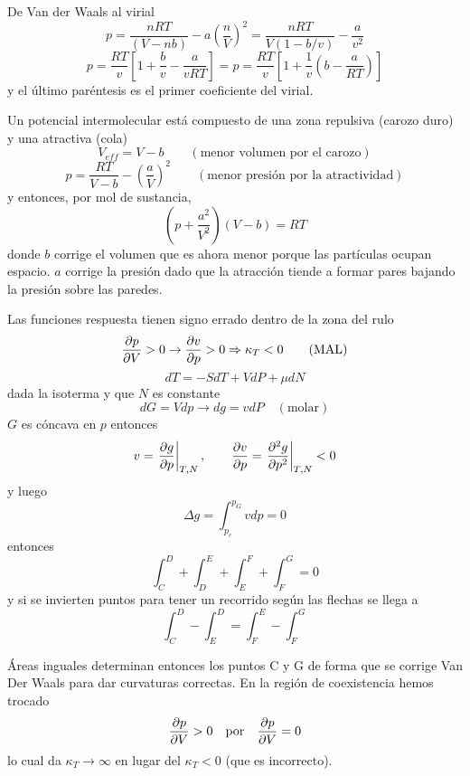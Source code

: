 \documentclass[10pt,oneside]{CBFT_book}
\begin{document}
De Van der Waals al virial
\[
	p = \frac{nRT}{(V-nb)} - a \left(\frac{n}{V} \right)^2 = 
	\frac{nRT}{V(1-b/v)}- \frac{a}{v^2}
\]
\[
	p = \frac{RT}{v}\left[ 1 + \frac{b}{v} - \frac{a}{vRT} \right] =
	p = \frac{RT}{v}\left[ 1 + \frac{1}{v}\left( b - \frac{a}{RT} \right) \right]
\]
y el último paréntesis es el primer coeficiente del virial.

Un potencial intermolecular está compuesto de una zona repulsiva (carozo duro) y una atractiva (cola)
\[
	V_{eff} = V-b \qquad (\text{menor volumen por el carozo})
\]
\[
	p = \frac{RT}{V-b} - \left(\frac{a}{V}\right)^2 \qquad (\text{menor presión por la atractividad})
\]
y entonces, por mol de sustancia,
\[
	\left( p +\frac{a^2}{V^2} \right)(V- b)= RT
\]
donde $b$ corrige el volumen que es ahora menor porque las partículas ocupan espacio. 
$a$ corrige la presión dado que la atracción tiende a formar pares bajando la presión sobre las paredes.

Las funciones respuesta tienen signo errado dentro de la zona del rulo
\[
	\dpar{p}{V}>0 \rightarrow  \dpar{v}{p} >0 \Rightarrow \kappa_T < 0 \qquad (\mathrm{MAL})
\]
\[
	dT = -SdT + VdP + \mu dN
\]
dada la isoterma y que $N$ es constante 
\[
	dG = Vdp \rightarrow dg = v dP \quad (\mathrm{molar})
\]
$G$ es cóncava en $p$ entonces 
\[
	v = \left.\dpar{g}{p} \right|_{T,N}, \qquad  
	\dpar{v}{p} =\left.\dpar[2]{g}{p} \right|_{T,N} < 0
\]
y luego 
\[
	\Delta g = \int_{p_c}^{p_G} v dp = 0
\]
entonces 
\[
	\int_C^D + \int_D^E + \int_E^F + \int_F^G = 0
\]
y si se invierten puntos para tener un recorrido según las flechas se llega a 
\[
	\int_C^D - \int_E^D = \int_F^E - \int_F^G 
\]

Áreas inguales determinan entonces los puntos C y G de forma que se corrige Van Der Waals para dar curvaturas
correctas. En la región de coexistencia hemos trocado
\[
	\dpar{p}{V} > 0 \quad \mathrm{por} \quad \dpar{p}{V}=0
\]
lo cual da $\kappa_T \to \infty$ en lugar del $\kappa_T < 0$ (que es incorrecto).









\end{document}

